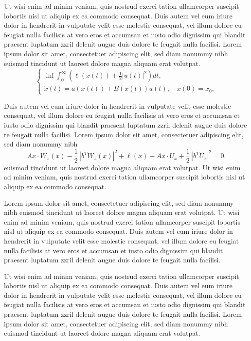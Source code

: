 \documentclass[oldfontcommands,6x9]{pupbook}
\begin{document}
Ut wisi enim ad minim veniam, quis nostrud exerci tation ullamcorper
suscipit lobortis nisl ut aliquip ex ea commodo consequat. Duis autem
vel eum iriure dolor in hendrerit in vulputate velit esse molestie
consequat, vel illum dolore eu feugiat nulla facilisis at vero eros et
accumsan et iusto odio dignissim qui blandit praesent luptatum zzril
delenit augue duis dolore te feugait nulla facilisi. Lorem ipsum dolor
sit amet, consectetuer adipiscing elit, sed diam nonummy nibh euismod
tincidunt ut laoreet dolore magna aliquam erat volutpat. 
\begin{equation} \label{eq2.10}
\left\{
\begin{array}{llr}
\inf \int^\infty_0 (\ell (x(t)) + \frac{1}{2} |u(t)|^2) dt, \\[6pt]
\dot{x} (t) = a (x(t)) + B(x(t)) u(t),\quad  x(0) = x_0,
\end{array}
\right.
\end{equation}


Duis autem vel eum iriure dolor in hendrerit in vulputate velit esse
molestie consequat, vel illum dolore eu feugiat nulla facilisis at vero
eros et accumsan et iusto odio dignissim qui blandit praesent luptatum
zzril delenit augue duis dolore te feugait nulla facilisi. Lorem ipsum
dolor sit amet, consectetuer adipiscing elit, sed diam nonummy nibh
$$
Ax \cdot W_x(x)-\frac{1}{2}\,|b^T W_x(x)|^2
+\ell(x)- Ax \cdot U_x+\frac{1}{2}\,|b^T U_x|^2=0.
$$
euismod tincidunt ut laoreet dolore magna aliquam erat volutpat. Ut wisi
enim ad minim veniam, quis nostrud exerci tation ullamcorper suscipit
lobortis nisl ut aliquip ex ea commodo consequat. 

Lorem ipsum dolor sit amet, consectetuer adipiscing elit, sed diam
nonummy nibh euismod tincidunt ut laoreet dolore magna aliquam erat
volutpat. Ut wisi enim ad minim veniam, quis nostrud exerci tation
ullamcorper suscipit lobortis nisl ut aliquip ex ea commodo consequat.
Duis autem vel eum iriure dolor in hendrerit in vulputate velit esse
molestie consequat, vel illum dolore eu feugiat nulla facilisis at vero
eros et accumsan et iusto odio dignissim qui blandit praesent luptatum
zzril delenit augue duis dolore te feugait nulla facilisi. 

Ut wisi enim ad minim veniam, quis nostrud exerci tation ullamcorper
suscipit lobortis nisl ut aliquip ex ea commodo consequat. Duis autem
vel eum iriure dolor in hendrerit in vulputate velit esse molestie
consequat, vel illum dolore eu feugiat nulla facilisis at vero eros et
accumsan et iusto odio dignissim qui blandit praesent luptatum zzril
delenit augue duis dolore te feugait nulla facilisi. Lorem ipsum dolor
sit amet, consectetuer adipiscing elit, sed diam nonummy nibh euismod
tincidunt ut laoreet dolore magna aliquam erat volutpat. 
\end{document}
